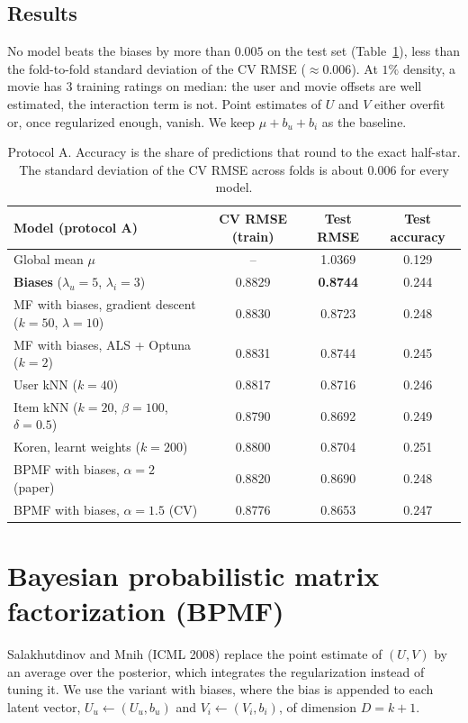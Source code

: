 \documentclass[11pt,a4paper]{article}
\begin{document}
\subsection{Results}
No model beats the biases by more than $0.005$ on the test set (Table~\ref{tab:baselines}), less than the
fold-to-fold standard deviation of the CV RMSE ($\approx 0.006$). At $1\%$ density, a movie has 3 training
ratings on median: the user and movie offsets are well estimated, the interaction term is not. Point
estimates of $U$ and $V$ either overfit or, once regularized enough, vanish. We keep $\mu + b_u + b_i$ as the baseline.

\begin{table}[h]
\centering\small
\begin{tabular}{lccc}
\toprule
Model (protocol A) & CV RMSE (train) & Test RMSE & Test accuracy \\
\midrule
Global mean $\mu$                                   & --     & 1.0369 & 0.129 \\
\textbf{Biases} ($\lambda_u=5$, $\lambda_i=3$)      & 0.8829 & \textbf{0.8744} & 0.244 \\
MF with biases, gradient descent ($k=50$, $\lambda=10$) & 0.8830 & 0.8723 & 0.248 \\
MF with biases, ALS + Optuna ($k=2$)                & 0.8831 & 0.8744 & 0.245 \\
User kNN ($k=40$)                                   & 0.8817 & 0.8716 & 0.246 \\
Item kNN ($k=20$, $\beta=100$, $\delta=0.5$)        & 0.8790 & 0.8692 & 0.249 \\
Koren, learnt weights ($k=200$)                     & 0.8800 & 0.8704 & 0.251 \\
\midrule
BPMF with biases, $\alpha = 2$ (paper)              & 0.8820 & 0.8690 & 0.248 \\
BPMF with biases, $\alpha = 1.5$ (CV)               & 0.8776 & 0.8653 & 0.247 \\
\bottomrule
\end{tabular}
\caption{Protocol A. Accuracy is the share of predictions that round to the exact half-star. The standard
deviation of the CV RMSE across folds is about $0.006$ for every model.}
\label{tab:baselines}
\end{table}

\section{Bayesian probabilistic matrix factorization (BPMF)}
Salakhutdinov and Mnih (ICML 2008) replace the point estimate of $(U, V)$ by an average over the posterior,
which integrates the regularization instead of tuning it. We use the variant with biases, where the bias is
appended to each latent vector, $U_u \leftarrow (U_u, b_u)$ and $V_i \leftarrow (V_i, b_i)$, of dimension
$D = k + 1$.
\end{document}

